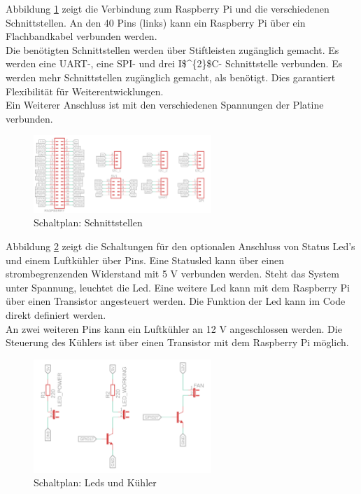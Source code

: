 Abbildung \ref{schnittstellen} zeigt die Verbindung zum Raspberry Pi und die verschiedenen Schnittstellen. An den 40 Pins (links) kann ein Raspberry Pi über ein Flachbandkabel verbunden werden. \\
Die benötigten Schnittstellen werden über Stiftleisten zugänglich gemacht. Es werden eine \ac{UART}-, eine \ac{SPI}- und drei \ac{I$^{2}$C}- Schnittstelle verbunden. Es werden mehr Schnittstellen zugänglich gemacht, als benötigt. Dies garantiert Flexibilität für Weiterentwicklungen. \\
Ein Weiterer Anschluss ist mit den verschiedenen Spannungen der Platine verbunden. 

\begin{figure}[H]
	\centering
	\includegraphics[width=0.6\textwidth]{images/Hardware/Schaltplan/Schnittstellen}
	\caption{Schaltplan: Schnittstellen}
	\label{schnittstellen}
\end{figure}

Abbildung \ref{leds} zeigt die Schaltungen für den optionalen Anschluss von Status Led's und einem Luftkühler über Pins. Eine Statusled kann über einen strombegrenzenden Widerstand mit 5 V verbunden werden. Steht das System unter Spannung, leuchtet die Led. Eine weitere Led kann mit dem Raspberry Pi über einen Transistor angesteuert werden. Die Funktion der Led kann im Code direkt definiert werden.\\
An zwei weiteren Pins kann ein Luftkühler an 12 V angeschlossen werden. Die Steuerung des Kühlers ist über einen Transistor mit dem Raspberry Pi möglich.
  
\begin{figure}[H]
	\centering
	\includegraphics[width=0.6\textwidth]{images/Hardware/Schaltplan/Leds}
	\caption{Schaltplan: Leds und Kühler}
	\label{leds}
\end{figure}




